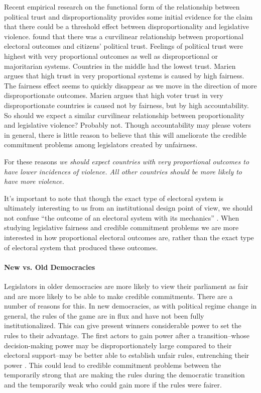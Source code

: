 \documentclass[a4paper]{article}\usepackage[]{graphicx}\usepackage[]{color}
\begin{document}
Recent empirical research on the functional form of the relationship between political trust and disproportionality provides some initial evidence for the claim that there could be a threshold effect between disproportionality and legislative violence. \cite{Marien2011} found that there was a curvilinear relationship between proportional electoral outcomes and citizens' political trust. Feelings of political trust were highest with very proportional outcomes as well as disproportional or majoritarian systems. Countries in the middle had the lowest trust. Marien argues that high trust in very proportional systems is caused by high fairness. The fairness effect seems to quickly disappear as we move in the direction of more disproportionate outcomes. Marien argues that high voter trust in very disproportionate countries is caused not by fairness, but by high accountability. So should we expect a similar curvilinear relationship between proportionality and legislative violence? Probably not. Though accountability may please voters in general, there is little reason to believe that this will ameliorate the credible commitment problems among legislators created by unfairness.

For these reasons \emph{we should expect countries with very proportional outcomes to have lower incidences of violence. All other countries should be more likely to have more violence.}

It's important to note that though the exact type of electoral system is ultimately interesting to us from an institutional design point of view, we should not confuse ``the outcome of an electoral system with its mechanics'' \citep[][109]{Golder2005}. When studying legislative fairness and credible commitment problems we are more interested in how proportional electoral outcomes are, rather than the exact type of electoral system that produced these outcomes.

\paragraph{New vs. Old Democracies}

Legislators in older democracies are more likely to view their parliament as fair and are more likely to be able to make credible commitments. There are a number of reasons for this. In new democracies, as with political regime change in general, the rules of the game are in flux and have not been fully institutionalized. This can give present winners considerable power to set the rules to their advantage. The first actors to gain power after a transition--whose decision-making power may be disproportionately large compared to their electoral support--may be better able to establish unfair rules, entrenching their power \cite[108]{Saideman2002}. This could lead to credible commitment problems between the temporarily strong that are making the rules during the democratic transition and the temporarily weak who could gain more if the rules were fairer.
\end{document}
